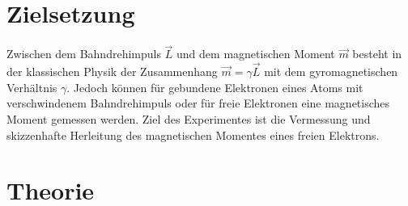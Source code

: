 \section{Zielsetzung}
\nocite{skript}
Zwischen dem Bahndrehimpuls $\vec{L}$ und dem magnetischen Moment $\vec{m}$
besteht in der klassischen Physik der Zusammenhang  $\vec{m} =\gamma \vec{L}$ mit
dem gyromagnetischen Verhältnis $\gamma$.
Jedoch können für gebundene Elektronen eines Atoms mit verschwindenem Bahndrehimpuls
oder für freie Elektronen eine magnetisches Moment gemessen werden.
Ziel des Experimentes ist die Vermessung und skizzenhafte Herleitung des magnetischen
Momentes eines freien Elektrons.

\section{Theorie}
\label{sec:Theorie}
